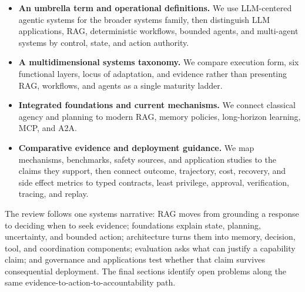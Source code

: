 \begin{itemize}
    \item \textbf{An umbrella term and operational definitions.} We use LLM-centered agentic systems for the broader systems family, then distinguish LLM applications, RAG, deterministic workflows, bounded agents, and multi-agent systems by control, state, and action authority.
    \item \textbf{A multidimensional systems taxonomy.} We compare execution form, six functional layers, locus of adaptation, and evidence rather than presenting RAG, workflows, and agents as a single maturity ladder.
    \item \textbf{Integrated foundations and current mechanisms.} We connect classical agency and planning to modern RAG, memory policies, long-horizon learning, MCP, and A2A.
    \item \textbf{Comparative evidence and deployment guidance.} We map mechanisms, benchmarks, safety sources, and application studies to the claims they support, then connect outcome, trajectory, cost, recovery, and side effect metrics to typed contracts, least privilege, approval, verification, tracing, and replay.
\end{itemize}

The review follows one systems narrative: RAG moves from grounding a response to deciding when to seek evidence; foundations explain state, planning, uncertainty, and bounded action; architecture turns them into memory, decision, tool, and coordination components; evaluation asks what can justify a capability claim; and governance and applications test whether that claim survives consequential deployment. The final sections identify open problems along the same evidence-to-action-to-accountability path.
